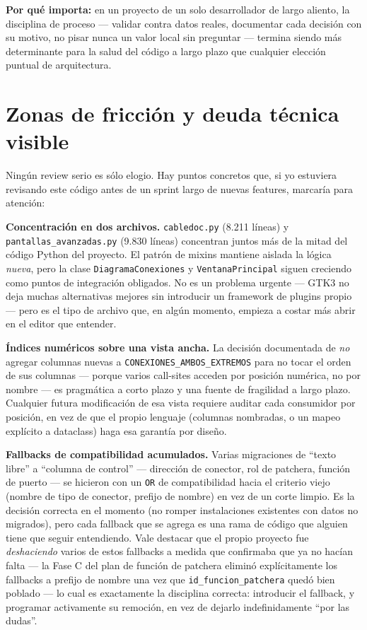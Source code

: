 \documentclass[11pt,twocolumn]{article}
\begin{document}
\begin{pullquote}
\headfont\textbf{Por qué importa:} en un proyecto de un solo desarrollador de largo aliento, la disciplina de proceso --- validar contra datos reales, documentar cada decisión con su motivo, no pisar nunca un valor local sin preguntar --- termina siendo más determinante para la salud del código a largo plazo que cualquier elección puntual de arquitectura.
\end{pullquote}

\section{Zonas de fricción y deuda técnica visible}

Ningún review serio es sólo elogio. Hay puntos concretos que, si yo estuviera revisando este código antes de un sprint largo de nuevas features, marcaría para atención:

\textbf{Concentración en dos archivos.} \texttt{cabledoc.py} (8.211 líneas) y \texttt{pantallas\_avanzadas.py} (9.830 líneas) concentran juntos más de la mitad del código Python del proyecto. El patrón de mixins mantiene aislada la lógica \emph{nueva}, pero la clase \texttt{DiagramaConexiones} y \texttt{VentanaPrincipal} siguen creciendo como puntos de integración obligados. No es un problema urgente --- GTK3 no deja muchas alternativas mejores sin introducir un framework de plugins propio --- pero es el tipo de archivo que, en algún momento, empieza a costar más abrir en el editor que entender.

\textbf{Índices numéricos sobre una vista ancha.} La decisión documentada de \emph{no} agregar columnas nuevas a \texttt{CONEXIONES\_AMBOS\_EXTREMOS} para no tocar el orden de sus columnas --- porque varios call-sites acceden por posición numérica, no por nombre --- es pragmática a corto plazo y una fuente de fragilidad a largo plazo. Cualquier futura modificación de esa vista requiere auditar cada consumidor por posición, en vez de que el propio lenguaje (columnas nombradas, o un mapeo explícito a dataclass) haga esa garantía por diseño.

\textbf{Fallbacks de compatibilidad acumulados.} Varias migraciones de ``texto libre'' a ``columna de control'' --- dirección de conector, rol de patchera, función de puerto --- se hicieron con un \texttt{OR} de compatibilidad hacia el criterio viejo (nombre de tipo de conector, prefijo de nombre) en vez de un corte limpio. Es la decisión correcta en el momento (no romper instalaciones existentes con datos no migrados), pero cada fallback que se agrega es una rama de código que alguien tiene que seguir entendiendo. Vale destacar que el propio proyecto fue \emph{deshaciendo} varios de estos fallbacks a medida que confirmaba que ya no hacían falta --- la Fase C del plan de función de patchera eliminó explícitamente los fallbacks a prefijo de nombre una vez que \texttt{id\_funcion\_patchera} quedó bien poblado --- lo cual es exactamente la disciplina correcta: introducir el fallback, y programar activamente su remoción, en vez de dejarlo indefinidamente ``por las dudas''.
\end{document}
